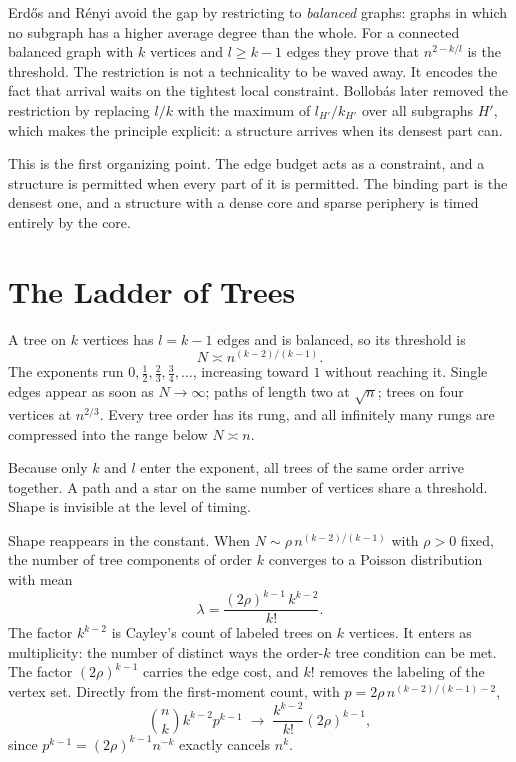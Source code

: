 \documentclass[11pt]{article}
\begin{document}
Erd\H{o}s and R\'enyi avoid the gap by restricting to \emph{balanced} graphs: graphs in which no subgraph has a higher average degree than the whole. For a connected balanced graph with $k$ vertices and $l\ge k-1$ edges they prove that $n^{2-k/l}$ is the threshold. The restriction is not a technicality to be waved away. It encodes the fact that arrival waits on the tightest local constraint. Bollob\'as later removed the restriction by replacing $l/k$ with the maximum of $l_{H'}/k_{H'}$ over all subgraphs $H'$, which makes the principle explicit: a structure arrives when its densest part can.

This is the first organizing point. The edge budget acts as a constraint, and a structure is permitted when every part of it is permitted. The binding part is the densest one, and a structure with a dense core and sparse periphery is timed entirely by the core.

\section{The Ladder of Trees}

A tree on $k$ vertices has $l = k-1$ edges and is balanced, so its threshold is
\[
N \asymp n^{(k-2)/(k-1)}.
\]
The exponents run $0, \tfrac12, \tfrac23, \tfrac34, \dots$, increasing toward $1$ without reaching it. Single edges appear as soon as $N\to\infty$; paths of length two at $\sqrt{n}$; trees on four vertices at $n^{2/3}$. Every tree order has its rung, and all infinitely many rungs are compressed into the range below $N \asymp n$.

Because only $k$ and $l$ enter the exponent, all trees of the same order arrive together. A path and a star on the same number of vertices share a threshold. Shape is invisible at the level of timing.

Shape reappears in the constant. When $N \sim \rho\, n^{(k-2)/(k-1)}$ with $\rho>0$ fixed, the number of tree components of order $k$ converges to a Poisson distribution with mean
\[
\lambda = \frac{(2\rho)^{k-1}\,k^{k-2}}{k!}.
\]
The factor $k^{k-2}$ is Cayley's count of labeled trees on $k$ vertices. It enters as multiplicity: the number of distinct ways the order-$k$ tree condition can be met. The factor $(2\rho)^{k-1}$ carries the edge cost, and $k!$ removes the labeling of the vertex set. Directly from the first-moment count, with $p = 2\rho\, n^{(k-2)/(k-1)-2}$,
\[
\binom{n}{k} k^{k-2} p^{k-1} \;\to\; \frac{k^{k-2}}{k!}(2\rho)^{k-1},
\]
since $p^{k-1} = (2\rho)^{k-1} n^{-k}$ exactly cancels $n^k$.
\end{document}
